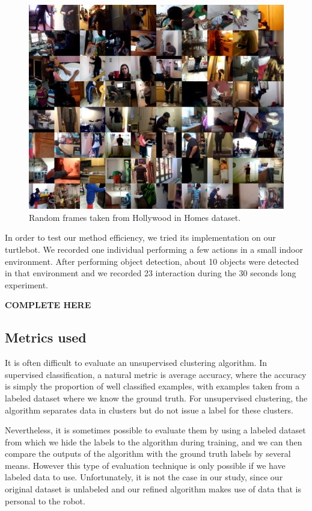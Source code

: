 \begin{figure}[htp]
\centering
\includegraphics[width=120mm, keepaspectratio]{images/HiH.png}
\caption{Random frames taken from Hollywood in Homes dataset.}
\label{fig:HiH}
\end{figure}

In order to test our method efficiency, we tried its implementation on our turtlebot. We recorded one individual performing a few actions in a small indoor environment. After performing object detection, about 10 objects were detected in that environment and we recorded 23 interaction during the 30 seconds long experiment.

\textbf{COMPLETE HERE}

\subsection{Metrics used}
It is often difficult to evaluate an unsupervised clustering algorithm. In supervised classification, a natural metric is average accuracy, where the accuracy is simply the proportion of well classified examples, with examples taken from a labeled dataset where we know the ground truth. For unsupervised clustering, the algorithm separates data in clusters but do not issue a label for these clusters. 

Nevertheless, it is sometimes possible to evaluate them by using a labeled dataset from which we hide the labels to the algorithm during training, and we can then compare the outputs of the algorithm with the ground truth labels by several means. However this type of evaluation technique is only possible if we have labeled data to use. Unfortunately, it is not the case in our study, since our original dataset is unlabeled and our refined algorithm makes use of data that is personal to the robot. 

